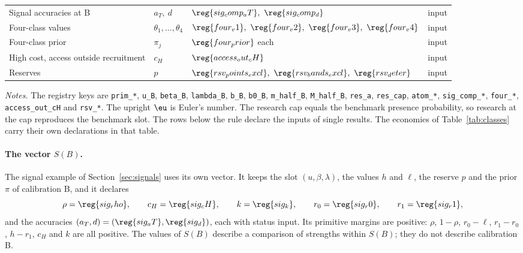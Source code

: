 \begin{table}[ht]
\begin{tabular}{@{}llll@{}}
Signal accuracies at B & \(a_T,\ d\) & \(\reg{sig_comp_aT},\ \reg{sig_comp_d}\) & input\\
Four-class values & \(\theta_1,\dots,\theta_4\) & \(\reg{four_v1},\ \reg{four_v2},\ \reg{four_v3},\ \reg{four_v4}\) & input\\
Four-class prior & \(\pi_j\) & \(\reg{four_prior}\) each & input\\
High cost, access outside recruitment & \(c_H\) & \(\reg{access_out_cH}\) & input\\
Reserves & \(p\) & \(\reg{rsv_points_excl},\ \reg{rsv_bands_excl},\ \reg{rsv_deter}\) & input\\
\bottomrule
\end{tabular}
\par\medskip
\begin{minipage}{0.92\linewidth}\footnotesize
\textit{Notes.} The registry keys are \texttt{prim\_*}, \texttt{u\_B}, \texttt{beta\_B}, \texttt{lambda\_B},
\texttt{b\_B}, \texttt{b0\_B}, \texttt{m\_half\_B}, \texttt{M\_half\_B}, \texttt{res\_a}, \texttt{res\_cap},
\texttt{atom\_*}, \texttt{sig\_comp\_*}, \texttt{four\_*}, \texttt{access\_out\_cH} and \texttt{rsv\_*}. The upright \(\eu\) is Euler's
number. The research cap equals the benchmark presence probability, so research at the cap reproduces the benchmark
slot. The rows below the rule declare the inputs of single results. The economies of Table~\ref{tab:classes} carry
their own declarations in that table.
\end{minipage}
\end{table}

\paragraph{The vector \(S(B)\).}
The signal example of Section~\ref{sec:signals} uses its own vector. It keeps the slot \((u,\beta,\lambda)\), the values
\(h\) and \(\ell\), the reserve \(p\) and the prior \(\pi\) of calibration B, and it declares
\[
\rho=\reg{sig_rho},\qquad c_H=\reg{sig_cH},\qquad k=\reg{sig_k},\qquad r_0=\reg{sig_r0},\qquad r_1=\reg{sig_r1},
\]
and the accuracies \((a_T,d)=(\reg{sig_aT},\reg{sig_d})\),
each with status input. Its primitive margins are positive: \(\rho\), \(1-\rho\), \(r_0-\ell\), \(r_1-r_0\), \(h-r_1\),
\(c_H\) and \(k\) are all positive. The values of \(S(B)\) describe a comparison of strengths within \(S(B)\); they do
not describe calibration B.

